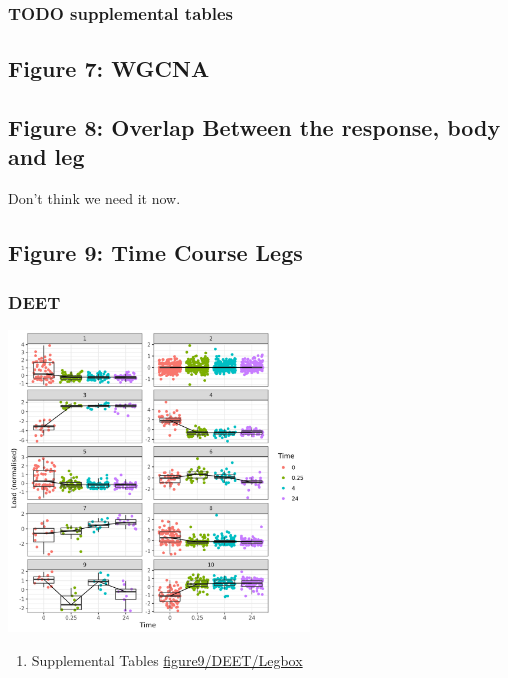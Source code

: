 \documentclass[11pt]{article}
\begin{document}
\subsubsection{{\bfseries\sffamily TODO} supplemental tables}
\label{sec:org75379a0}
\subsection{Figure 7: WGCNA}
\label{sec:org012262b}
\subsection{Figure 8: Overlap Between the response, body and leg}
\label{sec:org4aa5cb9}
Don't think we need it now.
\subsection{Figure 9: Time Course Legs}
\label{sec:orgac3c73d}
\subsubsection{DEET}
\label{sec:orgfd6a939}
\begin{center}
\includegraphics[width=0.6\textwidth]{figure9/DEET/Legbox.png}
\end{center}
\begin{enumerate}
\item Supplemental Tables
\label{sec:org3d6e145}
\url{figure9/DEET/Legbox}
\end{enumerate}
\end{document}
